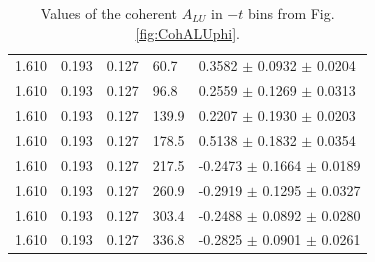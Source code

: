 \documentclass[aps,prc,preprint,superscriptaddress]{revtex4}
\begin{document}
\begin{table}[!h]
\begin{center}
\begin{tabular}{||l|l|l|l|l||}
  1.610 & 0.193 & 0.127 & 60.7  &  0.3582 $\pm$ 0.0932 $\pm$ 0.0204 \\
  1.610 & 0.193 & 0.127 & 96.8  &  0.2559 $\pm$ 0.1269 $\pm$ 0.0313 \\
  1.610 & 0.193 & 0.127 & 139.9 &  0.2207 $\pm$ 0.1930 $\pm$ 0.0203 \\
  1.610 & 0.193 & 0.127 & 178.5 &  0.5138 $\pm$ 0.1832 $\pm$ 0.0354 \\
  1.610 & 0.193 & 0.127 & 217.5 & -0.2473 $\pm$ 0.1664 $\pm$ 0.0189 \\
  1.610 & 0.193 & 0.127 & 260.9 & -0.2919 $\pm$ 0.1295 $\pm$ 0.0327 \\
  1.610 & 0.193 & 0.127 & 303.4 & -0.2488 $\pm$ 0.0892 $\pm$ 0.0280 \\
  1.610 & 0.193 & 0.127 & 336.8 & -0.2825 $\pm$ 0.0901 $\pm$ 0.0261 \\
         \hline
         \hline
      \end{tabular}
      \caption{Values of the coherent $A_{LU}$ in $-t$ bins from Fig. \ref{fig:CohALUphi}.}
      \label{table:Coh_t_BSA}
   \end{center}
\end{table}

\end{document}
